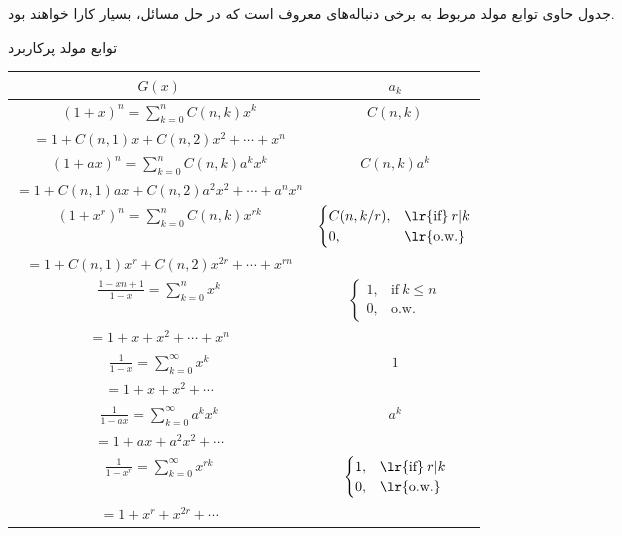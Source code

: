 \p
جدول
حاوی توابع مولد مربوط به برخی دنباله‌های معروف است که در حل مسائل،
بسیار کارا خواهند بود.

\begin{center}
  \small
   توابع مولد پرکاربرد
  \begin{longtable}{||c|c||}
    \hline
    \hline
    \textbf{$G(x)$} & \textbf{$a_k$} \\
    \hline
    \hline
    $(1 + x)^n = \sum\limits_{k=0}^{n}C(n, k)x^k$ & $C(n, k)$ \\
    \tiny{$= 1 + C(n, 1)x + C(n, 2)x^2 + \cdots + x^n$} & \\
    \hline
    $(1 + ax)^n = \sum\limits_{k=0}^{n}C(n, k)a^kx^k$ & $C(n, k)a^k$ \\
    \tiny{$= 1 + C(n, 1)ax + C(n, 2)a^2x^2 + \cdots + a^nx^n$} & \\
    \hline
    $(1 + x^r)^n = \sum\limits_{k=0}^{n}C(n, k)x^{rk}$ &
    $\begin{cases}
      C(n, k/r), & \text{\lr{if}}\: r|k \\
      0,         & \text{\lr{o.w.}}
    \end{cases}$ \\ 
    \tiny{$= 1 + C(n, 1)x^r + C(n, 2)x^{2r} + \cdots + x^{rn}$} &\\
    \hline       
    $\frac{1-x{n+1}}{1-x} = \sum\limits_{k=0}^{n}x^k$ &
    $\begin{cases}
      1, & \text{if}\: k \leq n \\
      0, & \text{o.w.}
    \end{cases}$ \\
    \tiny{$= 1 + x + x^2 + \cdots + x^n$} &\\
    \hline
    $\frac{1}{1-x} = \sum\limits_{k=0}^{\infty}x^k$ & $1$ \\
    \tiny{$= 1 + x + x^2 + \cdots$} & \\
    \hline
    $\frac{1}{1-ax} = \sum\limits_{k=0}^{\infty}a^kx^k$ & $a^k$ \\
    \tiny{$= 1 + ax + a^2x^2 + \cdots$} & \\
    \hline
    $\frac{1}{1-x^r} = \sum\limits_{k=0}^{\infty}x^{rk}$ & $
    \begin{cases}
      1, & \text{\lr{if}}\: r|k \\
      0, & \text{\lr{o.w.}}
    \end{cases}$ \\
    \tiny{$= 1 + x^r + x^{2r} + \cdots$} &\\

\end{longtable}
\end{center}
